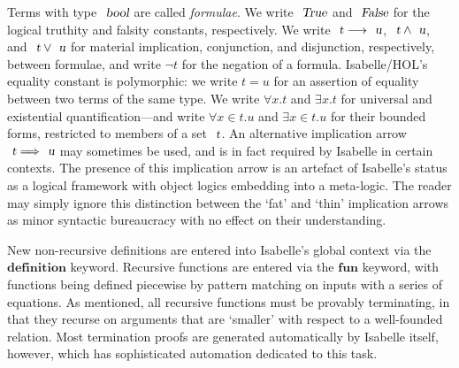 \documentclass[acmlarge,review,anonymous]{acmart}\settopmatter{printfolios=true}
\begin{document}
Terms with type $\isa{bool}$ are called \emph{formulae}.
We write $\isa{True}$ and $\isa{False}$ for the logical truthity and falsity constants, respectively.
We write $\isa{t} \longrightarrow \isa{u}$, $\isa{t} \wedge \isa{u}$, and $\isa{t} \vee \isa{u}$ for material implication, conjunction, and disjunction, respectively, between formulae, and write $\neg t$ for the negation of a formula.
Isabelle/HOL's equality constant is polymorphic: we write $t = u$ for an assertion of equality between two terms of the same type.
We write $\forall{x}.t$ and $\exists{x}.t$ for universal and existential quantification---and write $\forall{x{\in}t}.u$ and $\exists{x{\in}t}.u$ for their bounded forms, restricted to members of a set $\isa{t}$.
An alternative implication arrow $\isa{t} \Longrightarrow \isa{u}$ may sometimes be used, and is in fact required by Isabelle in certain contexts.
The presence of this implication arrow is an artefact of Isabelle's status as a logical framework with object logics embedding into a meta-logic.
The reader may simply ignore this distinction between the `fat' and `thin' implication arrows as minor syntactic bureaucracy with no effect on their understanding.

New non-recursive definitions are entered into Isabelle's global context via the $\mathbf{definition}$ keyword.
Recursive functions are entered via the $\mathbf{fun}$ keyword, with functions being defined piecewise by pattern matching on inputs with a series of equations.
As mentioned, all recursive functions must be provably terminating, in that they recurse on arguments that are `smaller' with respect to a well-founded relation.
Most termination proofs are generated automatically by Isabelle itself, however, which has sophisticated automation dedicated to this task.
\end{document}
